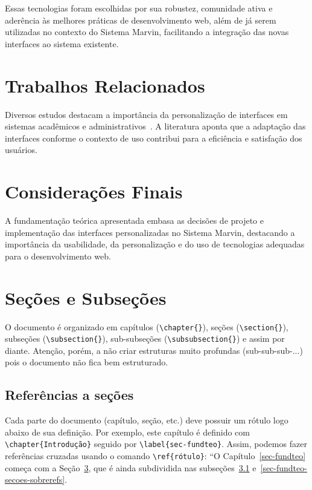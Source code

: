 Essas tecnologias foram escolhidas por sua robustez, comunidade ativa e aderência às melhores práticas de desenvolvimento web, além de já serem utilizadas no contexto do Sistema Marvin, facilitando a integração das novas interfaces ao sistema existente.


\section{Trabalhos Relacionados}

Diversos estudos destacam a importância da personalização de interfaces em sistemas acadêmicos e administrativos~\cite{albert1999internet, souza-mylopoulos:spe13}. A literatura aponta que a adaptação das interfaces conforme o contexto de uso contribui para a eficiência e satisfação dos usuários.

\section{Considerações Finais}

A fundamentação teórica apresentada embasa as decisões de projeto e implementação das interfaces personalizadas no Sistema Marvin, destacando a importância da usabilidade, da personalização e do uso de tecnologias adequadas para o desenvolvimento web.



\section{Seções e Subseções}
\label{sec-fundteo-secoes}

O documento é organizado em capítulos (\texttt{\textbackslash chapter\{\}}), seções (\texttt{\textbackslash section\{\}}), subseções (\texttt{\textbackslash subsection\{\}}), sub-subseções (\texttt{\textbackslash subsubsection\{\}}) e assim por diante. Atenção, porém, a não criar estruturas muito profundas (sub-sub-sub-...) pois o documento não fica bem estruturado.


\subsection{Referências a seções}
\label{sec-fundteo-secoes-refs}

Cada parte do documento (capítulo, seção, etc.) deve possuir um rótulo logo abaixo de sua definição. Por exemplo, este capítulo é definido com \texttt{\textbackslash chapter\{Introdução\}} seguido por \texttt{\textbackslash label\{sec-fundteo\}}. Assim, podemos fazer referências cruzadas usando o comando \texttt{\textbackslash ref\{rótulo\}}: ``O Capítulo~\ref{sec-fundteo} começa com a Seção~\ref{sec-fundteo-secoes}, que é ainda subdividida nas subseções~\ref{sec-fundteo-secoes-refs} e~\ref{sec-fundteo-secoes-sobrerefs}.

